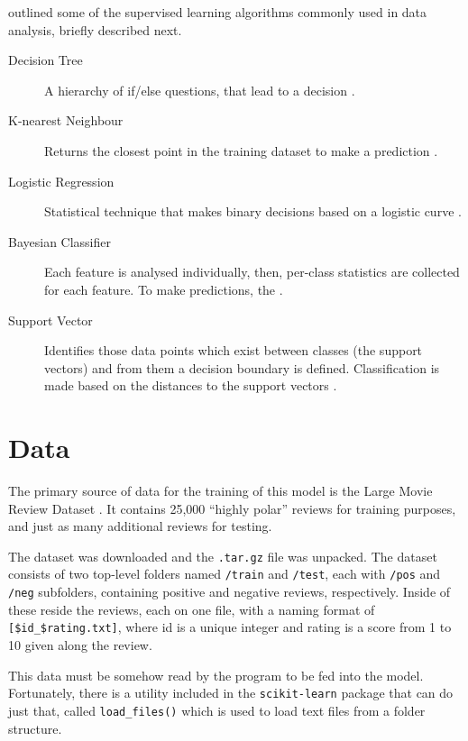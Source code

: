 \documentclass[a4paper,12pt]{article}
\begin{document}
\textcite{Jothi2015} outlined some of the supervised learning algorithms
commonly used in data analysis, briefly described next.

\begin{description}
    \item[Decision Tree] A hierarchy of if/else questions, that lead to a decision \parencite{Mueller2017}.
    \item[K-nearest Neighbour] Returns the closest point in the training dataset
    to make a prediction \parencite{Mueller2017}.
    \item[Logistic Regression] Statistical technique that makes binary decisions
    based on a logistic curve \parencite{Nick2007}.
    \item[Bayesian Classifier] Each feature is analysed individually, then,
    per-class statistics are collected for each feature. 
    To make predictions, the .
    \item[Support Vector] Identifies those data points which exist between classes
    (the support vectors) and from them a decision boundary is defined.
    Classification is made based on the distances to the support vectors \parencite[98]{Mueller2017}.
\end{description}

\section{Data}

The primary source of data for the training of this model is the Large Movie
Review Dataset \parencite{maas2011ACL}.
It contains 25,000 \enquote{highly polar} reviews for training purposes,
and just as many additional reviews for testing.

The dataset was downloaded and the {\tt .tar.gz} file was unpacked.
The dataset consists of two top-level folders named {\tt /train} and {\tt /test},
each with {\tt /pos} and {\tt /neg} subfolders, containing positive and negative
reviews, respectively.
Inside of these reside the reviews, each on one file, with a naming format of
{\tt [\$id\_\$rating.txt]}, where id is a unique integer and rating is a score
from 1 to 10 given along the review.

This data must be somehow read by the program to be fed into the model.
Fortunately, there is a utility included in the \texttt{scikit-learn} package
that can do just that, called \texttt{load\_files()} which is used to load text
files from a folder structure.
\end{document}

